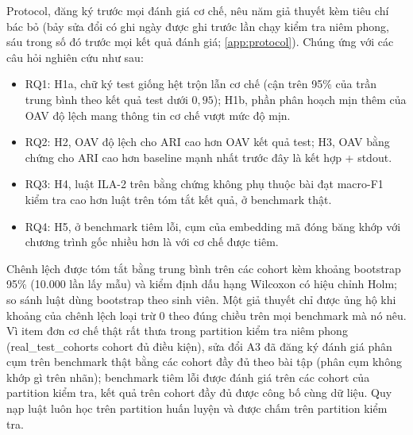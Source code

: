 Protocol, đăng ký trước mọi đánh giá cơ chế, nêu năm giả thuyết kèm tiêu chí bác bỏ (bảy sửa đổi có ghi ngày được ghi trước lần chạy kiểm tra niêm phong, sáu trong số đó trước mọi kết quả đánh giá; \cref{app:protocol}). Chúng ứng với các câu hỏi nghiên cứu như sau:
\begin{itemize}
\item RQ1: H1a, chữ ký test giống hệt trộn lẫn cơ chế (cận trên 95\% của trần trung bình theo kết quả test dưới $0{,}95$); H1b, phần phân hoạch mịn thêm của OAV độ lệch mang thông tin cơ chế vượt mức độ mịn.
\item RQ2: H2, OAV độ lệch cho ARI cao hơn OAV kết quả test; H3, OAV bằng chứng cho ARI cao hơn baseline mạnh nhất trước đây là kết hợp + stdout.
\item RQ3: H4, luật ILA-2 trên bằng chứng không phụ thuộc bài đạt macro-F1 kiểm tra cao hơn luật trên tóm tắt kết quả, ở benchmark thật.
\item RQ4: H5, ở benchmark tiêm lỗi, cụm của embedding mã đóng băng khớp với chương trình gốc nhiều hơn là với cơ chế được tiêm.
\end{itemize}
Chênh lệch được tóm tắt bằng trung bình trên các cohort kèm khoảng bootstrap 95\% (10.000 lần lấy mẫu) và kiểm định dấu hạng Wilcoxon có hiệu chỉnh Holm; so sánh luật dùng bootstrap theo sinh viên. Một giả thuyết chỉ được ủng hộ khi khoảng của chênh lệch loại trừ 0 theo đúng chiều trên mọi benchmark mà nó nêu. Vì item đơn cơ chế thật rất thưa trong partition kiểm tra niêm phong ({{real_test_cohorts}} cohort đủ điều kiện), sửa đổi A3 đã đăng ký đánh giá phân cụm trên benchmark thật bằng các cohort đầy đủ theo bài tập (phân cụm không khớp gì trên nhãn); benchmark tiêm lỗi được đánh giá trên các cohort của partition kiểm tra, kết quả trên cohort đầy đủ được công bố cùng dữ liệu. Quy nạp luật luôn học trên partition huấn luyện và được chấm trên partition kiểm tra.
